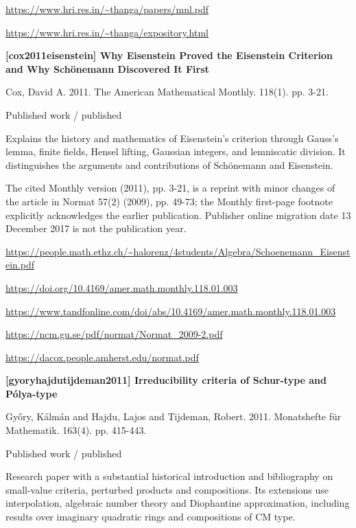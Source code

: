 \documentclass[11pt,a4paper,oneside,openany]{book}
\begin{document}
{\footnotesize\url{https://www.hri.res.in/~thanga/papers/mnl.pdf}}\par
{\footnotesize\url{https://www.hri.res.in/~thanga/expository.html}}\par
\vspace{9pt}
\hypertarget{ref:cox2011eisenstein}{}
{\sffamily\bfseries\color{atlasgreen}[cox2011eisenstein] Why Eisenstein Proved the Eisenstein Criterion and Why Schönemann Discovered It First}\par
\color{black} Cox, David A. 2011. The American Mathematical Monthly. 118(1). pp. 3-21.\par
{\small\sffamily\color{atlasgold}Published work / published}\par
\color{black} Explains the history and mathematics of Eisenstein's criterion through Gauss's lemma, finite fields, Hensel lifting, Gaussian integers, and lemniscatic division. It distinguishes the arguments and contributions of Schönemann and Eisenstein.\par
{\small The cited Monthly version (2011), pp. 3-21, is a reprint with minor changes of the article in Normat 57(2) (2009), pp. 49-73; the Monthly first-page footnote explicitly acknowledges the earlier publication. Publisher online migration date 13 December 2017 is not the publication year.}\par
{\footnotesize\url{https://people.math.ethz.ch/~halorenz/4students/Algebra/Schoenemann_Eisenstein.pdf}}\par
{\footnotesize\url{https://doi.org/10.4169/amer.math.monthly.118.01.003}}\par
{\footnotesize\url{https://www.tandfonline.com/doi/abs/10.4169/amer.math.monthly.118.01.003}}\par
{\footnotesize\url{https://ncm.gu.se/pdf/normat/Normat_2009-2.pdf}}\par
{\footnotesize\url{https://dacox.people.amherst.edu/normat.pdf}}\par
\vspace{9pt}
\hypertarget{ref:gyoryhajdutijdeman2011}{}
{\sffamily\bfseries\color{atlasgreen}[gyoryhajdutijdeman2011] Irreducibility criteria of Schur-type and Pólya-type}\par
\color{black} Győry, Kálmán and Hajdu, Lajos and Tijdeman, Robert. 2011. Monatshefte für Mathematik. 163(4). pp. 415-443.\par
{\small\sffamily\color{atlasgold}Published work / published}\par
\color{black} Research paper with a substantial historical introduction and bibliography on small-value criteria, perturbed products and compositions. Its extensions use interpolation, algebraic number theory and Diophantine approximation, including results over imaginary quadratic rings and compositions of CM type.\par
\end{document}
